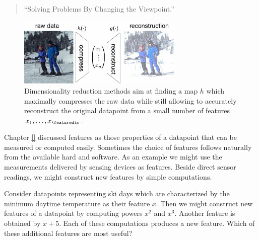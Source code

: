 \documentclass[12pt]{report}
\begin{document}
\begin{quote}
``Solving Problems By Changing the Viewpoint.''
\end{quote}

\begin{figure}[htbp]
\begin{center}
\includegraphics[width=0.7\textwidth]{DimRed.jpg}  
\end{center}
\caption{Dimensionality reduction methods aim at finding a map $h$ which maximally 
	compresses the raw data while still allowing to accurately reconstruct the original 
	datapoint from a small number of features $x_{1},\ldots,x_{\featuredim}$.}
\label{fig_dimred}
\end{figure}



Chapter \ref{} discussed features as those properties of a datapoint that can 
be measured or computed easily. Sometimes the choice of features follows 
naturally from the available hard and software. As an example we might use 
the measurements delivered by sensing devices as features. Beside direct 
sensor readings, we might construct new features by simple computations. 

Consider datapoints representing ski days which are characterized by the 
minimum daytime temperature as their feature $x$. Then we might construct 
new features of a datapoint by computing  powers $x^{2}$ and $x^{3}$. 
Another feature is obtained by $x+5$. Each of these computations produces 
a new feature. Which of these additional features are most useful?
%
\end{document}
